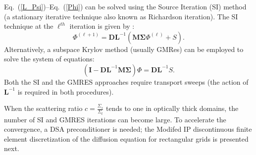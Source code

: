 \documentclass{mc2013}
\newcommand\bn{\boldsymbol{\nabla}}
\newcommand\bo{\boldsymbol{\Omega}}
\newcommand\br{\mathbf{r}}
\newcommand\bs{\boldsymbol}
\newcommand\mc{\mathcal}
\renewcommand{\(}{\left(}
\renewcommand{\)}{\right)}
\renewcommand{\[}{\left[}
\renewcommand{\]}{\right]}
\newcommand{\eqt}[1]{Eq.~(\ref{#1})}                     %
\begin{document}
\eqt{L_Psi}--\eqt{Phi} can be solved using the Source Iteration (SI) method (a
stationary iterative technique also known as Richardson iteration). The SI
technique at the $\ell^{th}$ iteration is given by :
\begin{equation}
  \Phi^{(\ell+1)} = \bs{DL}^{-1} \(\bs{M\Sigma}\Phi^{(\ell)} + S\) .
\end{equation}
Alternatively, a subspace Krylov method (usually GMRes) can be employed to
solve the system of equations:
\begin{equation}
  \(\bs{I} - \bs{DL}^{-1}\bs{M \Sigma}\) \Phi = \bs{DL}^{-1}S .
\end{equation}
Both the SI and the GMRES approaches require transport sweeps (the action of
$\bs{L}^{-1}$ is required in both procedures).

When the scattering ratio $c=\frac{\Sigma_s}{\Sigma_t}$ tends to one in
optically thick domains, the number of SI and GMRES iterations can become large. To
accelerate the convergence, a DSA preconditioner is needed; the Modifed IP
discontinuous finite element discretization of the diffusion equation for
rectangular grids is presented next.

%


 \label{sec:mip}
\end{document}
